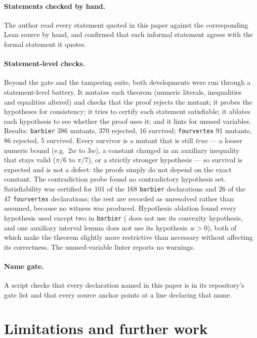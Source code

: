 \documentclass[11pt]{article}
\theoremstyle{definition}
\theoremstyle{remark}
\newcommand{\lean}[1]{\texttt{#1}}
\begin{document}
\paragraph{Statements checked by hand.} The author read every statement quoted in this paper against
the corresponding Lean source by hand, and confirmed that each informal statement agrees with the
formal statement it quotes.

\paragraph{Statement-level checks.} Beyond the gate and the tampering suite, both developments were
run through a statement-level battery. It mutates each theorem (numeric literals, inequalities and
equalities altered) and checks that the proof rejects the mutant; it probes the hypotheses for
consistency; it tries to certify each statement satisfiable; it ablates each hypothesis to see
whether the proof uses it; and it lints for unused variables. Results: \lean{barbier} 386 mutants,
370 rejected, 16 survived; \lean{fourvertex} 91 mutants, 86 rejected, 5 survived. Every survivor is a
mutant that is still \emph{true} --- a looser numeric bound (e.g.\ $2w$ to $3w$), a constant changed in
an auxiliary inequality that stays valid ($\pi/6$ to $\pi/7$), or a strictly stronger hypothesis ---
so survival is expected and is not a defect: the proofs simply do not depend on the exact constant.
The contradiction probe found no contradictory hypothesis set. Satisfiability was certified for 101
of the 168 \lean{barbier} declarations and 26 of the 47 \lean{fourvertex} declarations; the rest are
recorded as unresolved rather than assumed, because no witness was produced. Hypothesis ablation
found every hypothesis used except two in \lean{barbier} (
does not use its convexity hypothesis, and one auxiliary interval lemma does not use its hypothesis
$w>0$), both of which make the theorem slightly more restrictive than necessary without affecting its
correctness.
The unused-variable linter reports no warnings.

\paragraph{Name gate.} A script checks that every declaration named in this paper is in its
repository's gate list and that every source anchor points at a line declaring that name.

\section{Limitations and further work}\label{sec:limits}
\end{document}
